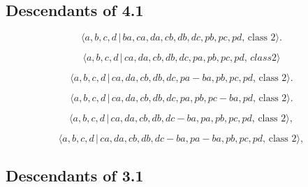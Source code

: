 \documentclass[10pt]{article}
\begin{document}
\subsection{Descendants of 4.1}

\begin{equation}
\langle a,b,c,d\,|\,ba,ca,da,cb,db,dc,pb,pc,pd,\,\text{class }2\rangle . 
\tag{5.2}
\end{equation}

\begin{equation}
\langle a,b,c,d\,|\,ca,da,cb,db,dc,pa,pb,pc,pd,\,class2\rangle  \tag{5.3}
\end{equation}

\begin{equation}
\langle a,b,c,d\,|\,ca,da,cb,db,dc,pa-ba,pb,pc,pd,\,\text{class }2\rangle . 
\tag{5.4}
\end{equation}

\begin{equation}
\langle a,b,c,d\,|\,ca,da,cb,db,dc,pa,pb,pc-ba,pd,\,\text{class }2\rangle . 
\tag{5.5}
\end{equation}

\begin{equation}
\langle a,b,c,d\,|\,ca,da,cb,db,dc-ba,pa,pb,pc,pd,\,\text{class }2\rangle , 
\tag{5.6}
\end{equation}

\begin{equation}
\langle a,b,c,d\,|\,ca,da,cb,db,dc-ba,pa-ba,pb,pc,pd,\,\text{class }2\rangle
,  \tag{5.7}
\end{equation}

\subsection{Descendants of 3.1}
\end{document}
